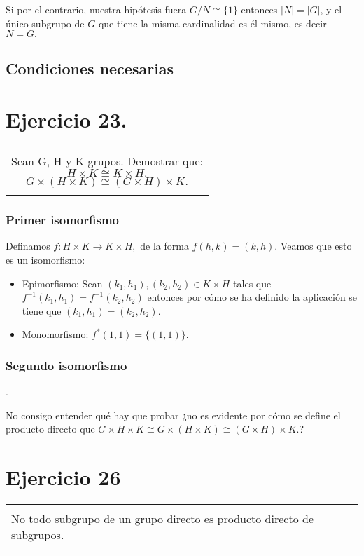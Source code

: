 \documentclass[12pt]{article}
\newenvironment{micaja}
{
    \begin{center}
    \begin{tabular}{|p{0.9\textwidth}|}
    \hline\\
    }   
    {   
    \\\\\hline
    \end{tabular} 
    \end{center}
    }
\begin{document}
Si por el contrario, nuestra hipótesis fuera $G/N \cong \{1\}$ entonces $|N| = |G|$, 
y el único subgrupo  de $G$ que tiene la misma cardinalidad es él mismo, es decir $N=G.$

\subsection*{Condiciones necesarias}



\newpage

\section{Ejercicio 23. }
\begin{micaja}
Sean G, H y K grupos. 
Demostrar que: 
$$H \times K \cong K \times H.$$  
$$G \times (H \times K) \cong (G \times H) \times K.$$
\end{micaja}

\subsubsection*{Primer isomorfismo}

Definamos $f: H \times K  \rightarrow K \times H, $ de la forma $f(h,k) = (k,h).$
Veamos que esto es un isomorfismo: 

\begin{itemize}
    \item Epimorfismo: Sean $(k_1,h_1), (k_2,h_2) \in K \times H$ 
    tales que $f^{-1}(k_1,h_1)=f^{-1}(k_2,h_2)$ entonces por cómo se ha definido la aplicación
    se tiene que $(k_1,h_1)=(k_2,h_2).$
    \item Monomorfismo: $f^*(1,1) = \{(1,1)\}$. 

\end{itemize}

\subsubsection*{Segundo isomorfismo}.

No consigo entender qué hay que probar ¿no es evidente por cómo se define
el producto directo que $G \times H \times K \cong G  \times (H \times K) \cong (G \times H) \times K.$?


\newpage

\section{Ejercicio 26}
\begin{micaja}

    No todo subgrupo de un grupo directo es producto directo de subgrupos.
\end{micaja}   
\end{document}
